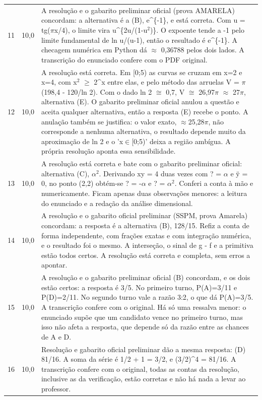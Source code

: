 \documentclass{article}%
\begin{document}
\begin{longtable}{@{}c c p{}@{}}
11 & 10,0 & A resolução e o gabarito preliminar oficial (prova AMARELA) concordam: a alternativa é a (B), e\^{}\{{-}1\}, e está correta. Com u = tg($\pi$x/4), o limite vira u\^{}\{2u/(1-u$^2$)\}. O expoente tende a -1 pelo limite fundamental de ln u/(u-1), então o resultado é e\^{}\{{-}1\}. A checagem numérica em Python dá $\approx$ 0,36788 pelos dois lados. A transcrição do enunciado confere com o PDF original. \\
12 & 10,0 & A resolução está correta. Em {[}0;5) as curvas se cruzam em x=2 e x=4, com x$^2$ $\geq$ 2\^{}x entre elas, e pelo método das arruelas V = $\pi$(198,4 - 120/ln 2). Com o dado ln 2 $\cong$ 0,7, V $\cong$ 26,97$\pi$ $\approx$ 27$\pi$, alternativa (E). O gabarito preliminar oficial anulou a questão e aceita qualquer alternativa, então a resposta (E) recebe o ponto. A anulação também se justifica: o valor exato, $\approx$25,28$\pi$, não corresponde a nenhuma alternativa, o resultado depende muito da aproximação de ln 2 e o 'x$\in${[}0;5)' deixa a região ambígua. A própria resolução aponta essa sensibilidade. \\
13 & 10,0 & A resolução está correta e bate com o gabarito preliminar oficial: alternativa (C), $\alpha$$^2$. Derivando xy = 4 duas vezes com ? = $\alpha$ e ÿ = 0, no ponto (2,2) obtém{-}se ? = -$\alpha$ e ? = $\alpha$$^2$. Conferi a conta à mão e numericamente. Ficam apenas duas observações menores: a leitura do enunciado e a redação da análise dimensional. \\
14 & 10,0 & A resolução e o gabarito oficial preliminar (SSPM, prova Amarela) concordam: a resposta é a alternativa (B), 128/15. Refiz a conta de forma independente, com frações exatas e com integração numérica, e o resultado foi o mesmo. A interseção, o sinal de g {-} f e a primitiva estão todos certos. A resolução está correta e completa, sem erros a apontar. \\
15 & 10,0 & A resolução e o gabarito preliminar oficial (B) concordam, e os dois estão certos: a resposta é 3/5. No primeiro turno, P(A)=3/11 e P(D)=2/11. No segundo turno vale a razão 3:2, o que dá P(A)=3/5. A transcrição confere com o original. Há só uma ressalva menor: o enunciado supõe que um candidato vence no primeiro turno, mas isso não afeta a resposta, que depende só da razão entre as chances de A e D. \\
16 & 10,0 & Resolução e gabarito oficial preliminar dão a mesma resposta: (D) 81/16. A soma da série é 1/2 + 1 = 3/2, e (3/2)\^{}4 = 81/16. A transcrição confere com o original, todas as contas da resolução, inclusive as da verificação, estão corretas e não há nada a levar ao professor. \\

\end{longtable}
\end{document}
